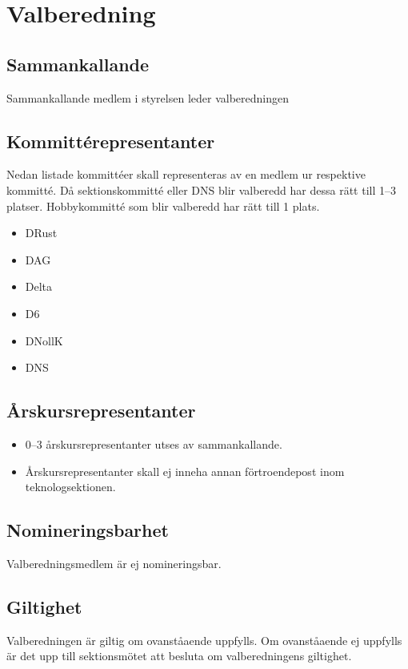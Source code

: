 \section{Valberedning}
\subsection{Sammankallande}
Sammankallande medlem i styrelsen leder valberedningen
\subsection{Kommittérepresentanter}
Nedan listade kommittéer skall representeras av en medlem ur respektive kommitté. Då sektionskommitté eller DNS blir valberedd har dessa rätt till 1--3 platser. Hobbykommitté som blir valberedd har rätt till 1 plats. 
\begin{itemize}
  \item DRust
  \item DAG 
  \item Delta 
  \item D6 
  \item DNollK
  \item DNS
\end{itemize}
\subsection{Årskursrepresentanter}
\begin{itemize}
  \item 0--3 årskursrepresentanter utses av sammankallande. 
  \item Årskursrepresentanter skall ej inneha annan förtroendepost inom teknologsektionen. 
\end{itemize}
\subsection{Nomineringsbarhet}
Valberedningsmedlem är ej nomineringsbar.
\subsection{Giltighet}
Valberedningen är giltig om ovanståaende uppfylls. Om ovanståaende ej uppfylls är det upp till sektionsmötet att besluta om valberedningens giltighet.
